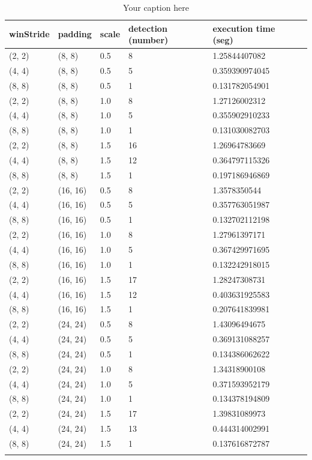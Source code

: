 \begin{longtable}{|l|l|l|l|l|l|} 
	\hline
	\textbf{winStride} & \textbf{padding} & \textbf{scale} & \textbf{detection (number)} & \textbf{execution time (seg)} \\ \hline
	(2, 2) & (8, 8) & 0.5 & 8 & 1.25844407082 \\ \hline
	(4, 4) & (8, 8) & 0.5 & 5 & 0.359390974045 \\ \hline
	(8, 8) & (8, 8) & 0.5 & 1 & 0.131782054901 \\ \hline
	(2, 2) & (8, 8) & 1.0 & 8 & 1.27126002312 \\ \hline
	(4, 4) & (8, 8) & 1.0 & 5 & 0.355902910233 \\ \hline
	(8, 8) & (8, 8) & 1.0 & 1 & 0.131030082703 \\ \hline
	(2, 2) & (8, 8) & 1.5 & 16 & 1.26964783669 \\ \hline
	(4, 4) & (8, 8) & 1.5 & 12 & 0.364797115326 \\ \hline
	(8, 8) & (8, 8) & 1.5 & 1 & 0.197186946869 \\ \hline
	(2, 2) & (16, 16) & 0.5 & 8 & 1.3578350544 \\ \hline
	(4, 4) & (16, 16) & 0.5 & 5 & 0.357763051987 \\ \hline
	(8, 8) & (16, 16) & 0.5 & 1 & 0.132702112198 \\ \hline
	(2, 2) & (16, 16) & 1.0 & 8 & 1.27961397171 \\ \hline
	(4, 4) & (16, 16) & 1.0 & 5 & 0.367429971695 \\ \hline
	(8, 8) & (16, 16) & 1.0 & 1 & 0.132242918015 \\ \hline
	(2, 2) & (16, 16) & 1.5 & 17 & 1.28247308731 \\ \hline
	(4, 4) & (16, 16) & 1.5 & 12 & 0.403631925583 \\ \hline
	(8, 8) & (16, 16) & 1.5 & 1 & 0.207641839981 \\ \hline
	(2, 2) & (24, 24) & 0.5 & 8 & 1.43096494675 \\ \hline
	(4, 4) & (24, 24) & 0.5 & 5 & 0.369131088257 \\ \hline
	(8, 8) & (24, 24) & 0.5 & 1 & 0.134386062622 \\ \hline
	(2, 2) & (24, 24) & 1.0 & 8 & 1.34318900108 \\ \hline
	(4, 4) & (24, 24) & 1.0 & 5 & 0.371593952179 \\ \hline
	(8, 8) & (24, 24) & 1.0 & 1 & 0.134378194809 \\ \hline
	(2, 2) & (24, 24) & 1.5 & 17 & 1.39831089973 \\ \hline
	(4, 4) & (24, 24) & 1.5 & 13 & 0.444314002991 \\ \hline
	(8, 8) & (24, 24) & 1.5 & 1 & 0.137616872787 \\ \hline

	\caption{Your caption here} %
	\label{tab:myfirstlongtable}
\end{longtable}






